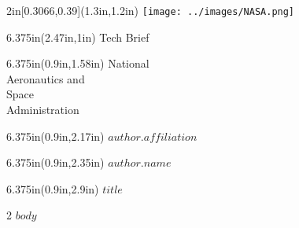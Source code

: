 \documentclass[$if(fontsize)$$fontsize$,$endif$$if(lang)$$lang$,$endif$]{$documentclass$}
\begin{document}
\begin{textblock*}{2in}[0.3066,0.39](1.3in,1.2in)
\texttt{[image: ../images/NASA.png]}
\end{textblock*}

\begin{textblock*}{6.375in}(2.47in,1in)
    \sffamily
	\fontsize{49pt}{0}
	\selectfont
	\setmainfont{Helvetica Light}
	Tech Brief
\end{textblock*}

\begin{textblock*}{6.375in}(0.9in,1.58in)
    \sffamily
	\fontsize{11pt}{0}
	\noindent
	\setmainfont{Helvetica Light}
	\selectfont National\\
    Aeronautics and\\
	Space\\
	Administration
\end{textblock*}

\begin{textblock*}{6.375in}(0.9in,2.17in)
    \sffamily
	\fontsize{14pt}{0}
	\noindent
	\setmainfont{Helvetica75-Bold}
    $author.affiliation$
\end{textblock*}


\begin{textblock*}{6.375in}(0.9in,2.35in)
    \sffamily
	\fontsize{12pt}{0}
	\noindent
	\setmainfont{Helvetica Light}
    $author.name$
\end{textblock*}


\begin{textblock*}{6.375in}(0.9in,2.9in)
	\noindent
	\fontsize{14pt}{0}
	\setmainfont{Helvetica75-Bold}
	$title$
\end{textblock*}

\vspace*{1.8in}

\begin{multicols}{2}
$body$

\end{multicols}
\end{document}
